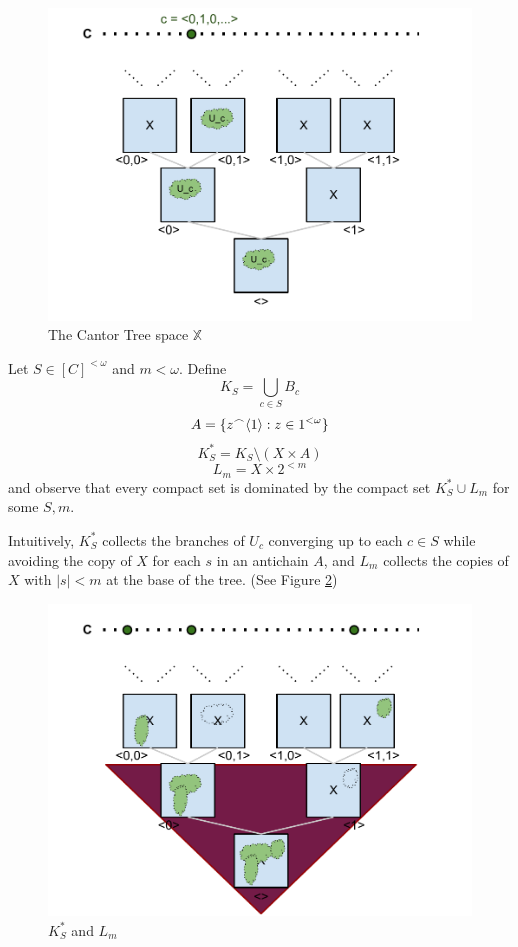 \begin{figure}[p]
  \centering
  \includegraphics[width=6in]{cantor_tree_open.pdf}
  \caption{The Cantor Tree space $\mathbb{X}$}
  \label{fig:cantor_tree}
\end{figure}

\begin{definition}
Let $S\in[C]^{<\omega}$ and $m<\omega$. Define 
  \[
    K_S = \bigcup_{c \in S} B_c
  \] 
  \[ 
    A = \{z^\frown \langle1\rangle : z \in 1^{<\omega}\}
  \] 
  \[ 
    K^*_S = K_S \setminus (X \times A)
  \] 
  \[
    L_m = X \times 2^{<m}
  \] 
and observe that every compact set is dominated by the compact set $K^*_S \cup L_m$ for some $S,m$.

Intuitively, $K^*_S$ collects the branches of $U_c$ converging up to each $c \in S$ while avoiding the copy of $X$ for each $s$ in an antichain $A$, and $L_m$ collects the copies of $X$ with $|s| < m$ at the base of the tree. (See Figure \ref{fig:cantor_tree_compact})
\end{definition}

\begin{figure}[p]
  \centering
  \includegraphics[width=6in]{cantor_tree_compact.pdf}
  \caption{$K^*_S$ and $L_m$}
  \label{fig:cantor_tree_compact}
\end{figure}


